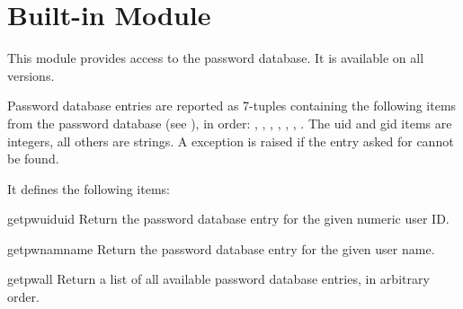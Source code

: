 \section{Built-in Module }
\label{module-pwd}

This module provides access to the \UNIX{} password database.
It is available on all \UNIX{} versions.

Password database entries are reported as 7-tuples containing the
following items from the password database (see ), in order:
,
,
,
,
,
,
.
The uid and gid items are integers, all others are strings.
A  exception is raised if the entry asked for cannot be found.

It defines the following items:

\begin{funcdesc}{getpwuid}{uid}
Return the password database entry for the given numeric user ID.
\end{funcdesc}

\begin{funcdesc}{getpwnam}{name}
Return the password database entry for the given user name.
\end{funcdesc}

\begin{funcdesc}{getpwall}{}
Return a list of all available password database entries, in arbitrary order.
\end{funcdesc}
